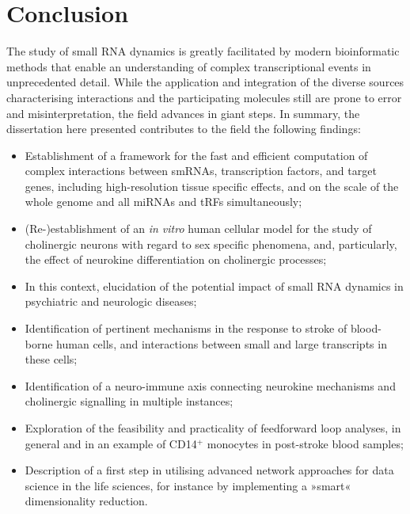 %

\chapter{Conclusion}
\label{conclusion}
The study of small RNA dynamics is greatly facilitated by modern bioinformatic methods that enable an understanding of complex transcriptional events in unprecedented detail. While the application and integration of the diverse sources characterising interactions and the participating molecules still are prone to error and misinterpretation, the field advances in giant steps. In summary, the dissertation here presented contributes to the field the following findings:

\begin{itemize}[noitemsep, leftmargin=.5cm, label={\tiny\raisebox{.5ex}{\textbullet}}, topsep=0pt]
\vspace{5pt}
\item Establishment of a framework for the fast and efficient computation of complex interactions between smRNAs, transcription factors, and target genes, including high-resolution tissue specific effects, and on the scale of the whole genome and all miRNAs and tRFs simultaneously;

\item (Re-)establishment of an \emph{in vitro} human cellular model for the study of cholinergic neurons with regard to sex specific phenomena, and, particularly, the effect of neurokine differentiation on cholinergic processes;

\item In this context, elucidation of the potential impact of small RNA dynamics in psychiatric and neurologic diseases;

\item Identification of pertinent mechanisms in the response to stroke of blood-borne human cells, and interactions between small and large transcripts in these cells;

\item Identification of a neuro-immune axis connecting neurokine mechanisms and cholinergic signalling in multiple instances;

\item Exploration of the feasibility and practicality of feedforward loop analyses, in general and in an example of CD14$^+$ monocytes in post-stroke blood samples;

\item Description of a first step in utilising advanced network approaches for data science in the life sciences, for instance by implementing a »smart« dimensionality reduction.
\end{itemize}

